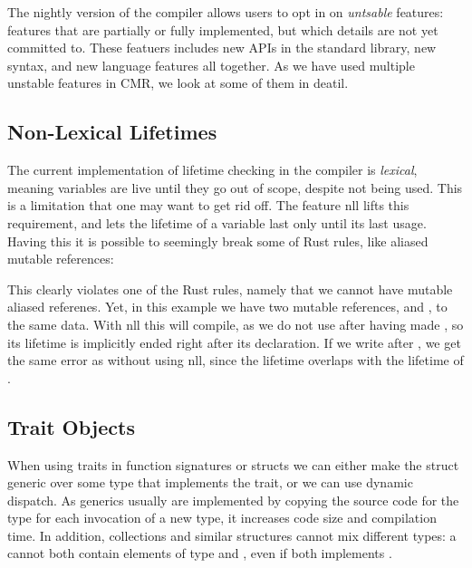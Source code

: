 The nightly version of the compiler allows users to opt in on \emph{untsable} features: features
that are partially or fully implemented, but which details are not yet committed to. These featuers
includes new APIs in the standard library, new syntax, and new language features all together.
As we have used multiple unstable features in CMR, we look at some of them in deatil.


\subsection{Non-Lexical Lifetimes\label{sec:nll}}
The current implementation of lifetime checking in the compiler is \emph{lexical}, meaning
variables are live until they go out of scope, despite not being used. This is a limitation that
one may want to get rid off. The feature \gls{nll} lifts this requirement, and lets the lifetime of
a variable last only until its last usage. Having this it is possible to seemingly break some of
Rust rules, like aliased mutable references:

This clearly violates one of the Rust rules, namely that we cannot have mutable aliased referenes.
Yet, in this example we have two mutable references,  and , to the same data.
With \gls{nll} this will compile, as we do not use  after having made , so its
lifetime is implicitly ended right after its declaration. If we write  after
, we get the same error as without using \gls{nll}, since the lifetime 
overlaps with the lifetime of .



\subsection{Trait Objects\label{sec:trait-objects}}

When using traits in function signatures or structs we can either make the struct generic over some
type that implements the trait, or we can use dynamic dispatch. As generics usually are implemented
by copying the source code for the type for each invocation of a new type, it increases code size
and compilation time. In addition, collections and similar structures cannot mix different types: a
 cannot both contain elements of type  and , even if both
implements .

